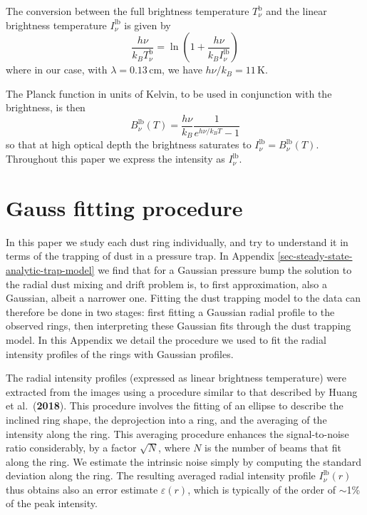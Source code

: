 \documentclass{aa}
\def\paperdsharphuangrings{Huang et al.\ ({\bf 2018})}
\begin{document}
The conversion between the full brightness temperature $T_\nu^{\mathrm{b}}$ and
the linear brightness temperature $I_\nu^{\mathrm{lb}}$ is given by
\begin{equation}\label{eq-convert-lin-to-full-bright}
\frac{h\nu}{k_BT_\nu^{\mathrm{b}}} = \ln\left(1+\frac{h\nu}{k_BI_\nu^{\mathrm{lb}}}\right)
\end{equation}
where in our case, with $\lambda=0.13\,\mathrm{cm}$, we have
$h\nu/k_B=11\,\mathrm{K}$.

The Planck function in units of Kelvin, to be used in conjunction with the
brightness, is then
\begin{equation}\label{eq-app-bnu-bright}
B_\nu^{\mathrm{lb}}(T) = \frac{h\nu}{k_B}\frac{1}{e^{h\nu/k_BT}-1}
\end{equation}
so that at high optical depth the brightness saturates to
$I_\nu^{\mathrm{lb}}=B_\nu^{\mathrm{lb}}(T)$. Throughout this paper we 
express the intensity as $I_\nu^{\mathrm{lb}}$. 



\section{Gauss fitting procedure}
\label{sec-gauss-fitting-procedure}
%
In this paper we study each dust ring individually, and try to understand it in
terms of the trapping of dust in a pressure trap. In Appendix
\ref{sec-steady-state-analytic-trap-model} we find that for a Gaussian pressure
bump the solution to the radial dust mixing and drift problem is, to first
approximation, also a Gaussian, albeit a narrower one. Fitting the dust trapping
model to the data can therefore be done in two stages: first fitting a Gaussian
radial profile to the observed rings, then interpreting these Gaussian fits
through the dust trapping model. In this Appendix we detail the procedure we
used to fit the radial intensity profiles of the rings with Gaussian profiles.

The radial intensity profiles (expressed as linear brightness temperature) were
extracted from the images using a procedure similar to that described by
\paperdsharphuangrings{}. This procedure involves the fitting of an ellipse to
describe the inclined ring shape, the deprojection into a ring, and the
averaging of the intensity along the ring. This averaging procedure enhances the
signal-to-noise ratio considerably, by a factor $\sqrt{N}$, where $N$ is the
number of beams that fit along the ring. We estimate the intrinsic noise simply
by computing the standard deviation along the ring. The resulting averaged
radial intensity profile $I_\nu^{\mathrm{lb}}(r)$ thus obtains also an error
estimate $\varepsilon(r)$, which is typically of the order of $\sim$1\% of
the peak intensity.
\end{document}
